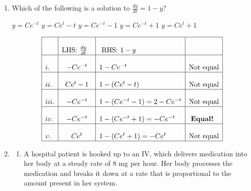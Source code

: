 \documentclass{article}
\begin{document}
\begin{enumerate}
\begin{solution}
\begin{enumerate}[label=\roman*.]
    \item If $M(t) = (1000 + 600 t) e^{0.06 t}$, then
      \begin{align*}
        \text{LHS: }&\frac{dM}{dt} = 0.06 (1000 + 600 t) e^{0.06 t} + 600 e^{0.06 t} \\
        \text{RHS: }&0.06 M + 600 = 0.06 (1000 + 600 t) e^{0.06 t} + 600
      \end{align*}
      These are not equal, so this is not the correct choice.

     
    \end{enumerate}
  \end{solution}
  

    \item

  
    
    \begin{problem}
    Which of the following is a solution to $\frac{dy}{dt} = 1 - y$?


    \begin{enumerate}[label=\protect\maybecircle{\roman*.}]
    \plainitem $y = Ce^{-t}$
    \plainitem $y = Ce^t -t$
    \plainitem $y = Ce^{-t} -1$
    \circleitem $y = Ce^{-t} +1$
    \plainitem $y = Ce^t +1$
  \end{enumerate}


  \end{problem}

  \begin{solution}
 $$ \begin{array}{|l|c|l|c|} \hline &&& \cr
 &\mbox{LHS: } \frac{dy}{dt} ~~&\mbox{  RHS: }  1-y & \cr \hline &&& \cr i. & -Ce^{-t} & 1-Ce^{-t} & \mbox{Not equal}\cr \hline &&& \cr ii. & Ce^t -1 & 1-(Ce^t -t) & \mbox{Not equal}\cr\hline &&& \cr iii. & -Ce^{-t}  & 1-(Ce^{-t} -1) = 2-Ce^{-t} & \mbox{Not equal}\cr\hline &&& \cr iv. &- Ce^{-t}  & 1-(Ce^{-t} +1) = -Ce^{-t}& \mbox{\bf{Equal!} }\cr \hline &&& \cr v. & Ce^t  & 1-(Ce^t +1) = -Ce^t & \mbox{Not equal}\cr \hline 
  \end{array}$$
 
  \end{solution}







\item \label{IV drug}
\begin{enumerate}
    \item{} 

\begin{problem}[\vfill]  A hospital patient is hooked up to an IV, which delivers medication into her body at a steady rate of 8 mg per hour. Her body processes the medication and breaks it down at a rate that is proportional to the amount present in her system. 


\end{problem}
\end{enumerate}
\end{enumerate}
\end{document}
